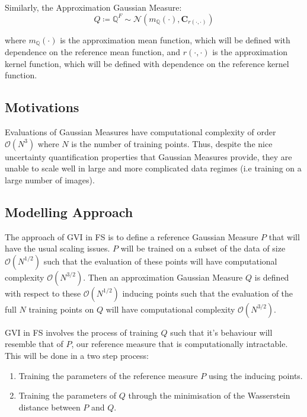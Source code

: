\documentclass[twoside,11pt]{article}
\begin{document}
Similarly, the Approximation Gaussian Measure:
\[Q \coloneqq \mathbb{Q}^{F} \sim \mathcal{N} (m_{\mathbb{Q}}(\cdot), \mathbf{C}_{r(\cdot, \cdot)})\]

where $m_{\mathbb{Q}}(\cdot)$ is the approximation mean function, which will be defined with dependence on the reference mean function, and $r(\cdot, \cdot)$ is the approximation kernel function, which will be defined with dependence on the reference kernel function.

\subsection{Motivations}\label{sec:motivations}


Evaluations of Gaussian Measures have computational complexity of order $\mathcal{O}(N^3)$ where $N$ is the number of training points.
Thus, despite the nice uncertainty quantification properties that Gaussian Measures provide, they are unable to scale well in large and more complicated data regimes (i.e training on a large number of images).


\subsection{Modelling Approach}\label{sec:modelling-approach}

The approach of GVI in FS is to define a reference Gaussian Measure $P$ that will have the usual scaling issues.
$P$ will be trained on a subset of the data of size $\mathcal{O}\left(N^{1/2}\right)$ such that the evaluation of these points will have computational complexity $\mathcal{O}\left(N^{3/2}\right)$.
Then an approximation Gaussian Measure $Q$ is defined with respect to these $\mathcal{O}\left(N^{1/2}\right)$ inducing points such that the evaluation of the full $N$ training points on $Q$ will have computational complexity $\mathcal{O}\left(N^{3/2}\right)$.

GVI in FS involves the process of training $Q$ such that it's behaviour will resemble that of $P$, our reference measure that is computationally intractable.
This will be done in a two step process:
\begin{enumerate}
    \item Training the parameters of the reference measure $P$ using the inducing points.
    \item Training the parameters of $Q$ through the minimisation of the Wasserstein distance between $P$ and $Q$.
\end{enumerate}
\end{document}
